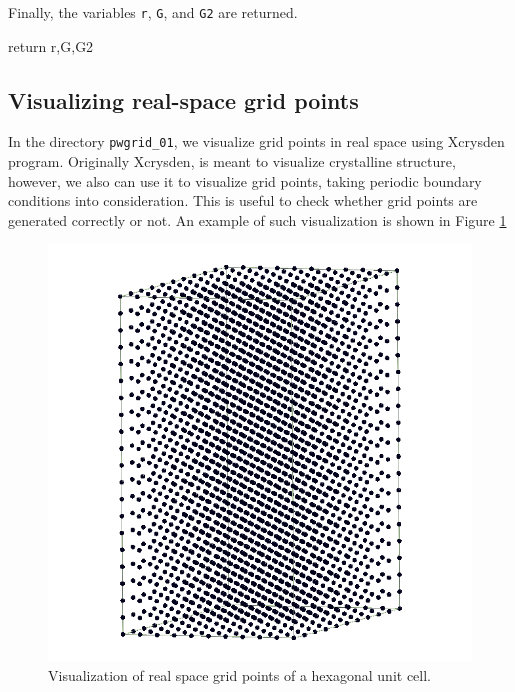 Finally, the variables \verb|r|, \verb|G|, and \verb|G2| are returned.

\begin{juliacode}
  return r,G,G2
\end{juliacode}


\subsection{Visualizing real-space grid points}

In the directory \verb|pwgrid_01|, we visualize grid points in real space
using Xcrysden program. Originally Xcrysden, is meant to visualize crystalline structure,
however, we also can use it to visualize grid points, taking periodic boundary
conditions into consideration.
This is useful to check whether grid points are generated correctly or not.
An example of such visualization is shown in Figure \ref{fig:R_grid_hex}

\begin{figure}
\centering
\includegraphics[scale=0.25]{images/R_grid_hexagonal.png}
\par
\caption{Visualization of real space grid points of a hexagonal unit cell.}
\label{fig:R_grid_hex}
\end{figure}
